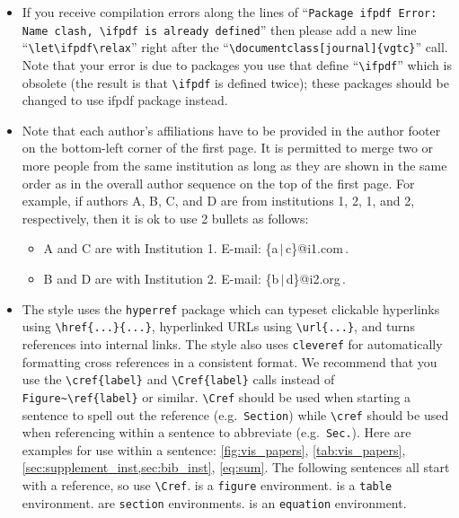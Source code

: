 \documentclass[journal]{vgtc}                %
\begin{document}
\begin{itemize}
	\item If you receive compilation errors along the lines of ``\texttt{Package ifpdf Error: Name clash, \textbackslash ifpdf is already defined}'' then please add a new line ``\texttt{\textbackslash let\textbackslash ifpdf\textbackslash relax}'' right after the ``\texttt{\textbackslash documentclass[journal]\{vgtc\}}'' call.	
		Note that your error is due to packages you use that define ``\texttt{\textbackslash ifpdf}'' which is obsolete (the result is that \texttt{\textbackslash ifpdf} is defined twice); these packages should be changed to use ifpdf package instead.
	
	\item Note that each author's affiliations have to be provided in the author footer on the bottom-left corner of the first page.
		It is permitted to merge two or more people from the same institution as long as they are shown in the same order as in the overall author sequence on the top of the first page.
		For example, if authors A, B, C, and D are from institutions 1, 2, 1, and 2, respectively, then it is ok to use 2 bullets as follows:
		\begin{itemize}		
			\item A and C are with Institution 1. E-mail: \{a\,$|$\,c\}@i1.com\,.
			
			\item B and D are with Institution 2. E-mail: \{b\,$|$\,d\}@i2.org\,.
		\end{itemize}
	
	\item The style uses the \verb|hyperref| package which can typeset clickable hyperlinks using \verb|\href{...}{...}|, hyperlinked URLs using \verb|\url{...}|, and turns references into internal links.
		The style also uses \verb|cleveref| for automatically formatting cross references in a consistent format.
		We recommend that you use the \verb|\cref{label}| and \verb|\Cref{label}| calls instead of \verb|Figure~\ref{label}| or similar.
		\verb|\Cref| should be used when starting a sentence to spell out the reference (e.g.\ \verb|Section|) while \verb|\cref| should be used when referencing within a sentence to abbreviate (e.g.\ \verb|Sec.|).
		Here are examples for use within a sentence: \cref{fig:vis_papers}, \cref{tab:vis_papers}, \cref{sec:supplement_inst,sec:bib_inst}, \cref{eq:sum}.
		The following sentences all start with a reference, so use \verb|\Cref|.
		 is a \verb|figure| environment.
		 is a \verb|table| environment. 
		 are \verb|section| environments.
		 is an \verb|equation| environment.
	

\end{itemize}
\end{document}
